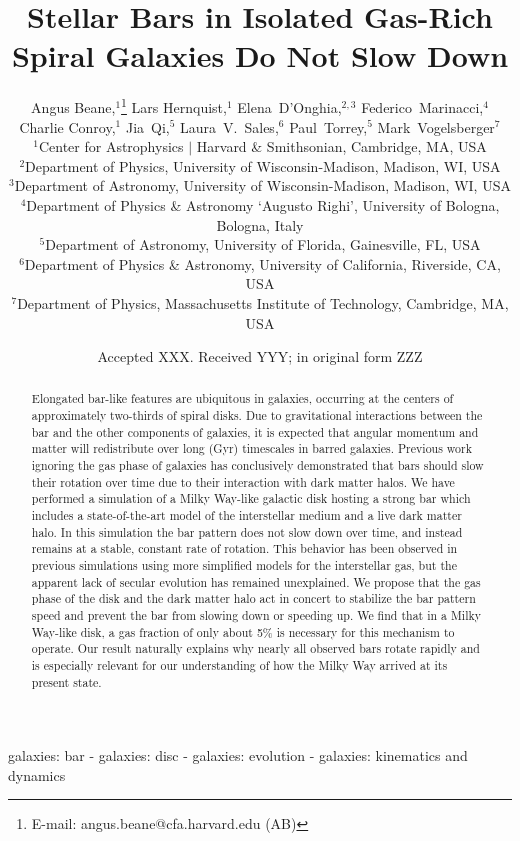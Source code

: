 \documentclass[fleqn,usenatbib]{mnras}
\title[Stellar Bars and Gas]{Stellar Bars in Isolated Gas-Rich Spiral Galaxies Do Not Slow Down}
\author[A. Beane et al.]{Angus Beane,$^{1}$\thanks{E-mail: angus.beane@cfa.harvard.edu (AB)}
Lars Hernquist,$^{1}$
Elena~D'Onghia,$^{2,3}$
Federico~Marinacci,$^{4}$
Charlie Conroy,$^{1}$
Jia~Qi,$^{5}$\newauthor
Laura~V.~Sales,$^{6}$
Paul~Torrey,$^{5}$
Mark~Vogelsberger$^{7}$
\\
$^{1}$Center for Astrophysics $|$ Harvard \& Smithsonian,  Cambridge, MA, USA\\
$^{2}$Department of Physics, University of Wisconsin-Madison, Madison, WI, USA\\
$^{3}$Department of Astronomy, University of Wisconsin-Madison, Madison, WI, USA\\
$^{4}$Department of Physics \& Astronomy `Augusto Righi', University of Bologna, Bologna, Italy\\
$^{5}$Department of Astronomy, University of Florida, Gainesville, FL, USA\\
$^{6}$Department of Physics \& Astronomy, University of California, Riverside, CA, USA\\
$^{7}$Department of Physics, Massachusetts Institute of Technology, Cambridge, MA, USA\\
}
\date{Accepted XXX. Received YYY; in original form ZZZ}
\begin{document}
\label{firstpage}
\pagerange{\pageref{firstpage}--\pageref{lastpage}}
\maketitle

\begin{abstract}
Elongated bar-like features are ubiquitous in galaxies, occurring at the centers
of approximately two-thirds of spiral disks.  Due to gravitational interactions
between the bar and the other components of galaxies, it is expected that
angular momentum and matter will redistribute over long (Gyr) timescales in
barred galaxies. Previous work ignoring the gas phase of galaxies has
conclusively demonstrated that bars should slow their rotation over time due to
their interaction with dark matter halos. We have performed a simulation of a
Milky Way-like galactic disk hosting a strong bar which includes a
state-of-the-art model of the interstellar medium and a live dark matter halo.
In this simulation the bar pattern does not slow down over time, and instead
remains at a stable, constant rate of rotation. This behavior has been observed
in previous simulations using more simplified models for the interstellar gas,
but the apparent lack of secular evolution has remained unexplained. We propose
that the gas phase of the disk and the dark matter halo act in concert to
stabilize the bar pattern speed and prevent the bar from slowing down or
speeding up. We find that in a Milky Way-like disk, a gas fraction of only about
5\% is necessary for this mechanism to operate. Our result naturally explains
why nearly all observed bars rotate rapidly and is especially relevant for our
understanding of how the Milky Way arrived at its present state.
\end{abstract}

\begin{keywords}
galaxies: bar - galaxies: disc - galaxies: evolution - galaxies: kinematics and
dynamics
\end{keywords}


\end{document}
